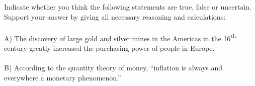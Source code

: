 \begin{homeworkProblem}[2]
    Indicate whether you think the following statements are true, false or 
    uncertain. Support your answer by giving all necessary reasoning and 
    calculations:
    \\ \\
    A) The discovery of large gold and silver mines in the Americas in the
    16\textsuperscript{th} century greatly increased the purchasing power
    of people in Europe.
    \\ \\
    B) According to the quantity theory of money, ``inflation is always
    and everywhere a monetary phenomenon.''
    \pagebreak
    
\end{homeworkProblem}